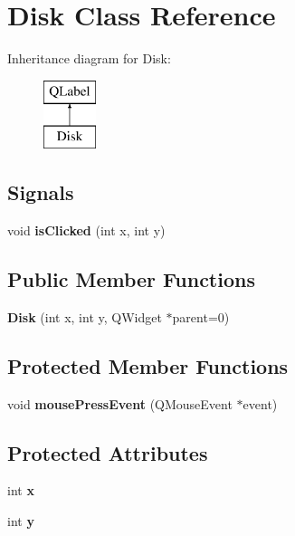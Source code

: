 \hypertarget{classDisk}{\section{Disk Class Reference}
\label{classDisk}
}
Inheritance diagram for Disk\-:\begin{figure}[H]
\begin{center}
\leavevmode
\includegraphics[height=2.000000cm]{classDisk}
\end{center}
\end{figure}
\subsection*{Signals}
\begin{DoxyCompactItemize}
\item 
\hypertarget{classDisk_ada7320e2b6fdc58f1817f4559328234d}{void {\bfseries is\-Clicked} (int x, int y)}\label{classDisk_ada7320e2b6fdc58f1817f4559328234d}

\end{DoxyCompactItemize}
\subsection*{Public Member Functions}
\begin{DoxyCompactItemize}
\item 
\hypertarget{classDisk_ae72358ce74405b34ae94e992c9c99cba}{{\bfseries Disk} (int x, int y, Q\-Widget $\ast$parent=0)}\label{classDisk_ae72358ce74405b34ae94e992c9c99cba}

\end{DoxyCompactItemize}
\subsection*{Protected Member Functions}
\begin{DoxyCompactItemize}
\item 
\hypertarget{classDisk_a4032f507d4b76e07b7698f0f7d35064f}{void {\bfseries mouse\-Press\-Event} (Q\-Mouse\-Event $\ast$event)}\label{classDisk_a4032f507d4b76e07b7698f0f7d35064f}

\end{DoxyCompactItemize}
\subsection*{Protected Attributes}
\begin{DoxyCompactItemize}
\item 
\hypertarget{classDisk_a6d81f44797948383abde236c71d64e24}{int {\bfseries x}}\label{classDisk_a6d81f44797948383abde236c71d64e24}

\item 
\hypertarget{classDisk_a6e79396d7682708ca86ee350af791bc4}{int {\bfseries y}}\label{classDisk_a6e79396d7682708ca86ee350af791bc4}

\end{DoxyCompactItemize}


